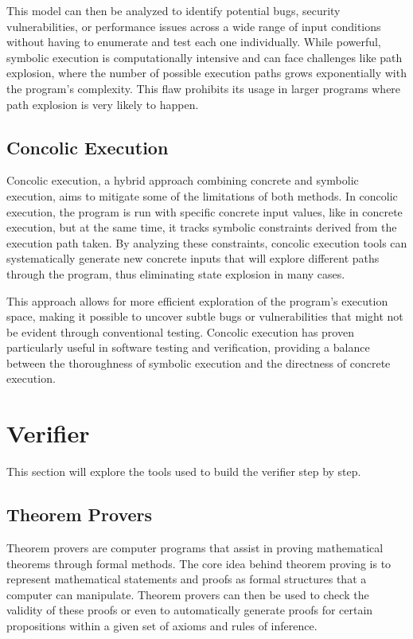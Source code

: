 This model can then be analyzed to identify potential bugs, security vulnerabilities, or performance issues across a wide range of input conditions without having to enumerate and test each one individually. 
While powerful, symbolic execution is computationally intensive and can face challenges like path explosion, where the number of possible execution paths grows exponentially with the program's complexity.
This flaw prohibits its usage in larger programs where path explosion is very likely to happen.

\subsection{Concolic Execution} 
Concolic execution, a hybrid approach combining concrete and symbolic execution, aims to mitigate some of the limitations of both methods. 
In concolic execution, the program is run with specific concrete input values, like in concrete execution, but at the same time, it tracks symbolic constraints derived from the execution path taken. 
By analyzing these constraints, concolic execution tools can systematically generate new concrete inputs that will explore different paths through the program, thus eliminating state explosion in many cases.

This approach allows for more efficient exploration of the program's execution space, making it possible to uncover subtle bugs or vulnerabilities that might not be evident through conventional testing. 
Concolic execution has proven particularly useful in software testing and verification, providing a balance between the thoroughness of symbolic execution and the directness of concrete execution.

\section{Verifier}
This section will explore the tools used to build the verifier step by step.

\subsection{Theorem Provers}
Theorem provers are computer programs that assist in proving mathematical theorems through formal methods.
The core idea behind theorem proving is to represent mathematical statements and proofs as formal structures that a computer can manipulate.
Theorem provers can then be used to check the validity of these proofs or even to automatically generate proofs for certain propositions within a given set of axioms and rules of inference.

